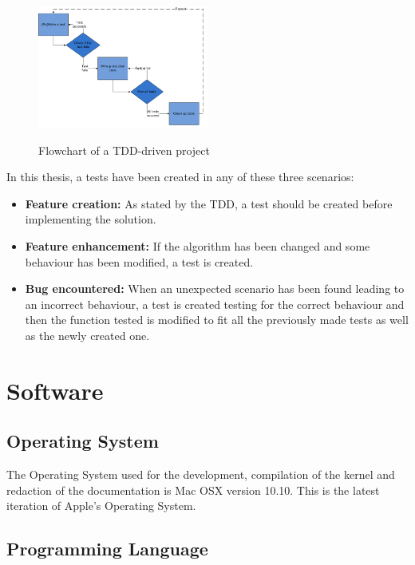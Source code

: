 \begin{figure}
\begin{center}
\includegraphics[width=0.5\textwidth]{includes/figures/chapter3_tdd_flowchart.png}  \\[0.5 cm]
\caption{Flowchart of a TDD-driven project}
\end{center}
\end{figure}


In this thesis, a tests have been created in any of these three scenarios:
\begin{itemize}
\item\textbf{Feature creation:} As stated by the TDD, a test should be created before implementing the solution.
\item\textbf{Feature enhancement:} If the algorithm has been changed and some behaviour has been modified, a test is created.
\item\textbf{Bug encountered:} When an unexpected scenario has been found leading to an incorrect behaviour, a test is created testing for the correct behaviour and then the function tested is modified to fit all the previously made tests as well as the newly created one.
\end{itemize}



\section{Software}\label{chapter3_software}

\subsection{Operating System}
The Operating System used for the development, compilation of the kernel and redaction of the documentation is Mac OSX version 10.10. This is the latest iteration of Apple's Operating System.


\subsection{Programming Language}

